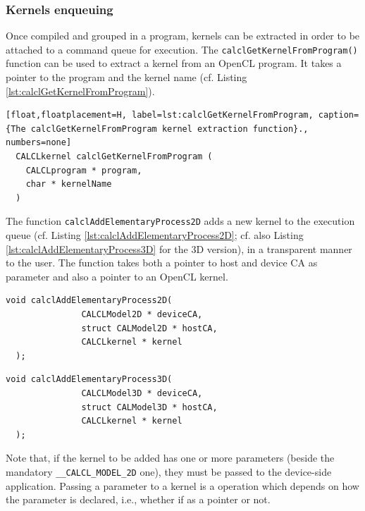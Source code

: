 \subsubsection{Kernels enqueuing}

Once compiled and grouped in a program, kernels can be
extracted in order to be attached to a command queue for
execution. The \verb'calclGetKernelFromProgram()' function can be used
to extract a kernel from an OpenCL program. It takes a pointer to the
program and the kernel name (cf. Listing
\ref{lst:calclGetKernelFromProgram}).

\begin{lstlisting}[float,floatplacement=H, label=lst:calclGetKernelFromProgram, caption={The calclGetKernelFromProgram kernel extraction function}., numbers=none]
  CALCLkernel calclGetKernelFromProgram (
    CALCLprogram * program,
    char * kernelName
  )
\end{lstlisting}

The function \verb'calclAddElementaryProcess2D' adds a new kernel to
the execution queue (cf. Listing
\ref{lst:calclAddElementaryProcess2D}; cf. also Listing
\ref{lst:calclAddElementaryProcess3D} for the 3D version), in a
transparent manner to the user. The function takes both a pointer to
host and device CA as parameter and also a pointer to an OpenCL
kernel.

\begin{lstlisting}[float,floatplacement=TH, label=lst:calclAddElementaryProcess2D, caption=The calclAddElementaryProcess2D() function., numbers=none]
  void calclAddElementaryProcess2D(
               CALCLModel2D * deviceCA,
               struct CALModel2D * hostCA,
               CALCLkernel * kernel
  );
\end{lstlisting}

\begin{lstlisting}[float,floatplacement=TH, label=lst:calclAddElementaryProcess3D, caption=The calclAddElementaryProcess3D() function., numbers=none]
  void calclAddElementaryProcess3D(
               CALCLModel3D * deviceCA,
               struct CALModel3D * hostCA,
               CALCLkernel * kernel
  );
\end{lstlisting}

Note that, if the kernel to be added has one or more parameters
(beside the mandatory \verb'__CALCL_MODEL_2D' one), they must be
passed to the device-side application. Passing a parameter to a
kernel is a operation which depends on how the parameter is declared, i.e., 
whether if as a pointer or not.

